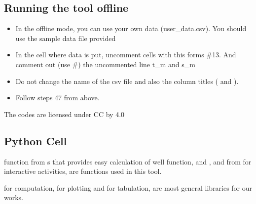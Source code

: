 \documentclass[letterpaper,10pt,english]{jupyterBook}
\begin{document}
\subsection{Running the tool offline}
\label{\detokenize{content/tools/type_curve_fit:running-the-tool-offline}}\begin{itemize}
\item {} 
\sphinxAtStartPar
In the offline mode, you can use your own data (user\_data.csv). You should use the sample data file provided 

\item {} 
\sphinxAtStartPar
In the cell where data is put, uncomment cells with this forms \#1\sphinxhyphen{}3. And comment out (use \#) the uncommented line t\_m and s\_m

\item {} 
\sphinxAtStartPar
Do not change the name of the csv file  and also the column titles ( and  ).

\item {} 
\sphinxAtStartPar
Follow steps 4\sphinxhyphen{}7 from above. 

\end{itemize}

\sphinxAtStartPar
The codes are licensed under CC by 4.0 


\subsection{Python  Cell}
\label{\detokenize{content/tools/type_curve_fit:python-libraries-cell}}
\sphinxAtStartPar
{} function from s that provides easy calculation of well function, and ,  and  from  \sphinxhyphen{} for interactive activities, are  functions used in this tool.

\sphinxAtStartPar
{} for computation,  for plotting and  for tabulation, are most general libraries for our works.
\end{document}
